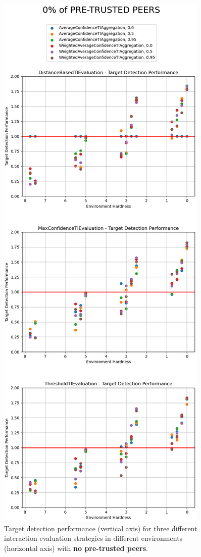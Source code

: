 \begin{figure}[hp]
    \centering
    \includegraphics[height=0.9\textheight]{assets/0_target_detection.png}
    \caption{Target detection performance (vertical axis) for three different interaction evaluation strategies in different environments (horizontal axis) with \textbf{no pre-trusted peers}.}
    \label{fig:0-target-detection}
\end{figure}

